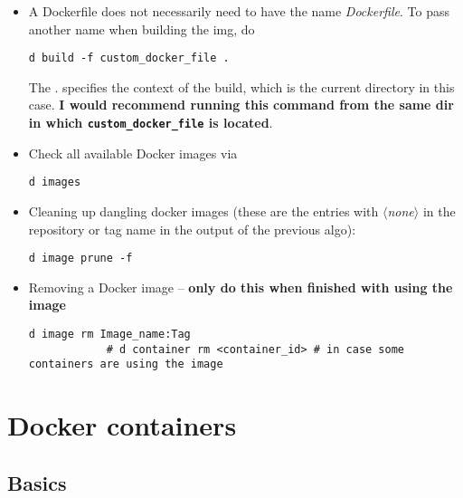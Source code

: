 \documentclass[12pt, a4paper]{scrbook}
\numberwithin{equation}{section}
\theoremstyle{definition}
\theoremstyle{definition}
\begin{document}
	\begin{itemize}
		
		\item A Dockerfile does not necessarily need to have the name \textit{Dockerfile}. To pass another name when building the img, do 
		
		\begin{lstlisting}[style=mystylebash, label=alg:docker__build_with_custom_img_name, xleftmargin=\parindent]
			d build -f custom_docker_file .
		\end{lstlisting}
		
		The . specifies the context of the build, which is the current directory in this case. \textbf{I would recommend running this command from the same dir in which \texttt{custom\_docker\_file} is located}.
		
		\item Check all available Docker images via
		
		\begin{lstlisting}[style=mystylebash, label=alg:docker__check_avail_imgs, xleftmargin=\parindent]
			d images
		\end{lstlisting}
		
		\item Cleaning up dangling docker images (these are the entries with \textit{$\langle$none$\rangle$} in the repository or tag name in the output of the previous algo):
		
		\begin{lstlisting}[style=mystylebash, label=alg:docker_rm__dangling, xleftmargin=\parindent]
			d image prune -f
		\end{lstlisting}
		
		\item Removing a Docker image -- \textbf{only do this when finished with using the image}
		
		\begin{lstlisting}[style=mystylebash, label=alg:docker_remove, xleftmargin=\parindent]
			d image rm Image_name:Tag
			# d container rm <container_id> # in case some containers are using the image
		\end{lstlisting}
		
	\end{itemize}
	
	\section{Docker containers}
	
	\subsection{Basics}
	
\end{document}
